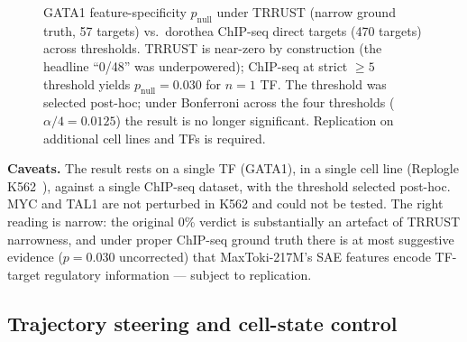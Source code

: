 \documentclass{article}
\newcommand{\maxtoki}{MaxToki-217M\xspace}
\begin{document}
\begin{figure}[t]
\centering
{}
\caption{GATA1 feature-specificity $p_{\text{null}}$ under TRRUST
(narrow ground truth, 57 targets) vs.~dorothea ChIP-seq direct
targets (470 targets) across thresholds. TRRUST is
near-zero by construction (the headline ``0/48'' was
underpowered); ChIP-seq at strict $\geq 5$ threshold yields
$p_{\text{null}}=0.030$ for $n{=}1$ TF. The threshold was selected
post-hoc; under Bonferroni across the four thresholds
($\alpha/4{=}0.0125$) the result is no longer significant.
Replication on additional cell lines and TFs is required.}
\label{fig:gata1}
\end{figure}

\textbf{Caveats.} The result rests on a single TF (GATA1), in a
single cell line (Replogle K562~\citep{replogle2022perturbseq}),
against a single ChIP-seq dataset, with the threshold selected
post-hoc. MYC and TAL1 are not perturbed in K562 and could not be
tested. The right reading is narrow: the original 0\% verdict is
substantially an artefact of TRRUST narrowness, and under proper
ChIP-seq ground truth there is at most suggestive evidence
($p=0.030$ uncorrected) that \maxtoki{}'s SAE features encode
TF-target regulatory information --- subject to replication.

\subsection{Trajectory steering and cell-state control}
\label{sec:trajectory_steering}
\end{document}
